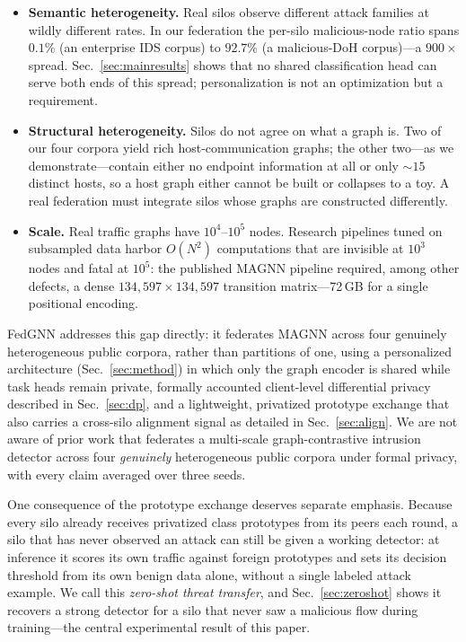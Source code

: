 \documentclass[journal]{IEEEtran}
\begin{document}
\begin{itemize}
\item \textbf{Semantic heterogeneity.} Real silos observe different
attack families at wildly different rates. In our federation the
per-silo malicious-node ratio spans $0.1\%$ (an enterprise IDS corpus)
to $92.7\%$ (a malicious-DoH corpus)---a $900\times$ spread.
Sec.~\ref{sec:mainresults} shows that no shared classification head
can serve both ends of this spread; personalization is not an
optimization but a requirement.
\item \textbf{Structural heterogeneity.} Silos do not agree on what a
graph is. Two of our four corpora yield rich host-communication
graphs; the other two---as we demonstrate---contain either no endpoint
information at all or only ${\sim}15$ distinct hosts, so a host graph
either cannot be built or collapses to a toy. A real federation must
integrate silos whose graphs are constructed differently.
\item \textbf{Scale.} Real traffic graphs have $10^{4}$--$10^{5}$
nodes. Research pipelines tuned on subsampled data harbor
$O(N^{2})$ computations that are invisible at $10^{3}$ nodes and fatal
at $10^{5}$: the published MAGNN pipeline required, among other
defects, a dense $134{,}597 \times 134{,}597$ transition
matrix---72\,GB for a single positional encoding.
\end{itemize}

FedGNN addresses this gap directly: it federates MAGNN across four
genuinely heterogeneous public corpora, rather than partitions of one,
using a personalized architecture (Sec.~\ref{sec:method}) in which
only the graph encoder is shared while task heads remain private,
formally accounted client-level differential privacy described in
Sec.~\ref{sec:dp}, and a lightweight, privatized prototype exchange
that also carries a cross-silo alignment signal as detailed in
Sec.~\ref{sec:align}.
We are not aware of prior work that federates a multi-scale
graph-contrastive intrusion detector across four \emph{genuinely}
heterogeneous public corpora under formal privacy, with every claim
averaged over three seeds.

One consequence of the prototype exchange deserves separate emphasis.
Because every silo already receives privatized class prototypes from
its peers each round, a silo that has never observed an attack can
still be given a working detector: at inference it scores its own
traffic against foreign prototypes and sets its decision threshold
from its own benign data alone, without a single labeled attack
example. We call this \emph{zero-shot threat transfer}, and
Sec.~\ref{sec:zeroshot} shows it recovers a strong detector for a silo
that never saw a malicious flow during training---the central
experimental result of this paper.
\end{document}
